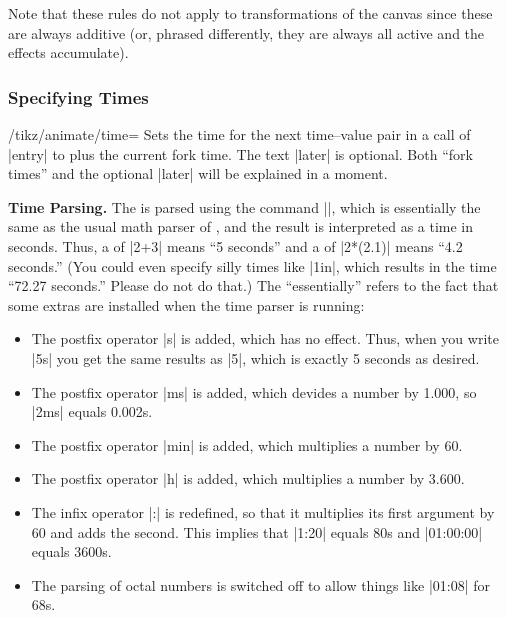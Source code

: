 Note that these rules do not apply to transformations of the canvas
since these are always additive (or, phrased differently, they are
always all active and the effects accumulate).



\subsubsection{Specifying Times}
\label{section-anim-def-times}


\begin{key}{/tikz/animate/time=}
  Sets the time for the next time--value pair in a call of |entry| to
   plus the current fork time. The text |later|
  is optional. Both ``fork times'' and the optional |later| will be
  explained in a moment.

  \medskip\textbf{Time Parsing.}
  The  is parsed using the command |\pgfparsetime|, which is
  essentially the same as the usual math parser of \tikzname, and the
  result is interpreted as a time in seconds. Thus, a  of |2+3|
  means ``5 seconds'' and a  of |2*(2.1)| means ``4.2
  seconds.'' (You could even specify silly times like |1in|, which
  results in the time ``72.27 seconds.'' Please do not do that.)
  The ``essentially''  refers to the fact that some extras are installed
  when the time parser is running:
  
  \begin{itemize}
  \item 
    The postfix operator |s| is added, which has no effect. Thus, when
    you write |5s| you get the same results as |5|, which is exactly 5
    seconds as desired.
  \item The postfix operator |ms| is added, which devides a number by
    1.000, so |2ms| equals 0.002s.
  \item
    The postfix operator |min| is added, which multiplies a number by
    60.
  \item The postfix operator |h| is added, which multiplies a number by
    3.600.
  \item The infix operator |:| is redefined, so that it multiplies its
    first argument by 60 and adds the second. This implies that
    |1:20| equals 80s and |01:00:00| equals 3600s. 
  \item The parsing of octal numbers is switched off to allow things
    like |01:08| for 68s. 
  \end{itemize}


\end{key}
